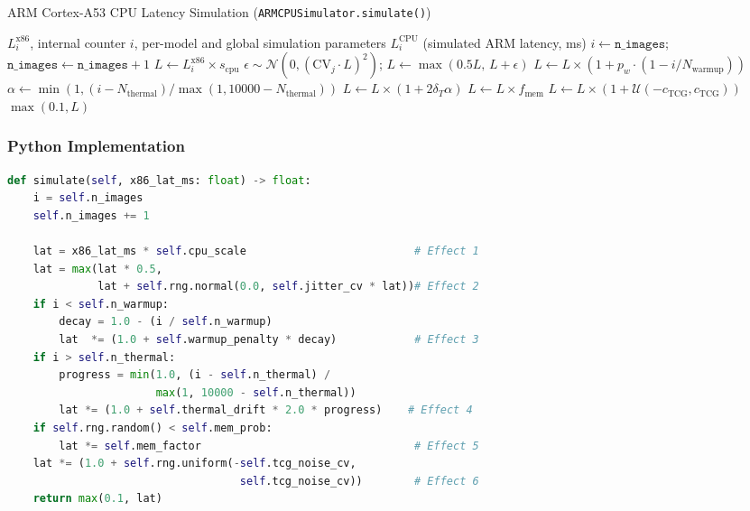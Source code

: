 \begin{algorithm}[H]
\caption{ARM Cortex-A53 CPU Latency Simulation
         (\texttt{ARMCPUSimulator.simulate()})}
\label{alg:m2_arm_cpu_sim}
\begin{algorithmic}[1]
\Require $L_i^{\text{x86}}$, internal counter $i$, per-model and global
         simulation parameters
\Ensure $L_i^{\text{CPU}}$ (simulated ARM latency, ms)
\State $i\gets\texttt{n\_images}$;\quad$\texttt{n\_images}\gets\texttt{n\_images}+1$
\State $L\gets L_i^{\text{x86}}\times s_{\text{cpu}}$
\State $\epsilon\sim\mathcal{N}(0,(\mathrm{CV}_j\cdot L)^2)$;\quad
       $L\gets\max(0.5L,\,L+\epsilon)$
    \State $L\gets L\times(1+p_w\cdot(1-i/N_{\text{warmup}}))$
\EndIf
{}
    \State $\alpha\gets\min(1,(i-N_{\text{thermal}})/\max(1,10000-N_{\text{thermal}}))$
    \State $L\gets L\times(1+2\delta_T\alpha)$
\EndIf
{}
    \State $L\gets L\times f_{\text{mem}}$
\EndIf
\State $L\gets L\times(1+\mathcal{U}(-c_{\text{TCG}},c_{\text{TCG}}))$
\State\Return $\max(0.1,L)$
\end{algorithmic}
\end{algorithm}

\subsubsection{Python Implementation}

\begin{lstlisting}[language=Python,
    caption={\texttt{ARMCPUSimulator.simulate()} from
             \texttt{inference\_qemu.py}.}]
def simulate(self, x86_lat_ms: float) -> float:
    i = self.n_images
    self.n_images += 1

    lat = x86_lat_ms * self.cpu_scale                          # Effect 1
    lat = max(lat * 0.5,
              lat + self.rng.normal(0.0, self.jitter_cv * lat))# Effect 2
    if i < self.n_warmup:
        decay = 1.0 - (i / self.n_warmup)
        lat  *= (1.0 + self.warmup_penalty * decay)            # Effect 3
    if i > self.n_thermal:
        progress = min(1.0, (i - self.n_thermal) /
                       max(1, 10000 - self.n_thermal))
        lat *= (1.0 + self.thermal_drift * 2.0 * progress)    # Effect 4
    if self.rng.random() < self.mem_prob:
        lat *= self.mem_factor                                 # Effect 5
    lat *= (1.0 + self.rng.uniform(-self.tcg_noise_cv,
                                    self.tcg_noise_cv))        # Effect 6
    return max(0.1, lat)
\end{lstlisting}

